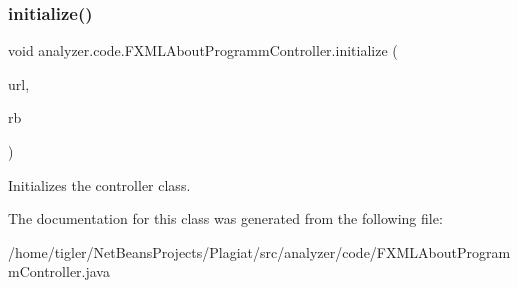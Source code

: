 \subsubsection{\texorpdfstring{initialize()}{initialize()}}
{\footnotesize\ttfamily void analyzer.\+code.\+F\+X\+M\+L\+About\+Programm\+Controller.\+initialize (\begin{DoxyParamCaption}\item[{U\+RL}]{url,  }\item[{Resource\+Bundle}]{rb }\end{DoxyParamCaption})\hspace{0.3cm}{\ttfamily [inline]}}

Initializes the controller class. 

The documentation for this class was generated from the following file\+:\begin{DoxyCompactItemize}
\item 
/home/tigler/\+Net\+Beans\+Projects/\+Plagiat/src/analyzer/code/F\+X\+M\+L\+About\+Programm\+Controller.\+java\end{DoxyCompactItemize}
